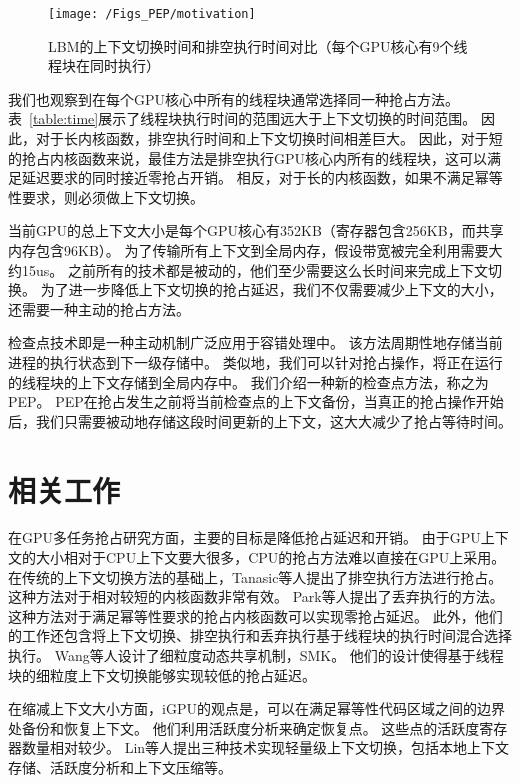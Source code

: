 \begin{figure}[htbp] %
  \centering
  \texttt{[image: /Figs\_PEP/motivation]}
  \caption{LBM的上下文切换时间和排空执行时间对比（每个GPU核心有9个线程块在同时执行）}
  \label{fig:motivation}
\end{figure}


我们也观察到在每个GPU核心中所有的线程块通常选择同一种抢占方法。
表~\ref{table:time}展示了线程块执行时间的范围远大于上下文切换的时间范围。
因此，对于长内核函数，排空执行时间和上下文切换时间相差巨大。
因此，对于短的抢占内核函数来说，最佳方法是排空执行GPU核心内所有的线程块，这可以满足延迟要求的同时接近零抢占开销。
相反，对于长的内核函数，如果不满足幂等性要求，则必须做上下文切换。

当前GPU的总上下文大小是每个GPU核心有352KB（寄存器包含256KB，而共享内存包含96KB）。
为了传输所有上下文到全局内存，假设带宽被完全利用需要大约15us。
之前所有的技术都是被动的，他们至少需要这么长时间来完成上下文切换。
为了进一步降低上下文切换的抢占延迟，我们不仅需要减少上下文的大小，还需要一种主动的抢占方法。

检查点技术即是一种主动机制广泛应用于容错处理中。
该方法周期性地存储当前进程的执行状态到下一级存储中。
类似地，我们可以针对抢占操作，将正在运行的线程块的上下文存储到全局内存中。
我们介绍一种新的检查点方法，称之为PEP。
PEP在抢占发生之前将当前检查点的上下文备份，当真正的抢占操作开始后，我们只需要被动地存储这段时间更新的上下文，这大大减少了抢占等待时间。

\section{相关工作}

在GPU多任务抢占研究方面，主要的目标是降低抢占延迟和开销。
由于GPU上下文的大小相对于CPU上下文要大很多，CPU的抢占方法难以直接在GPU上采用。
在传统的上下文切换方法的基础上，Tanasic等人提出了排空执行方法进行抢占。
这种方法对于相对较短的内核函数非常有效。
Park等人提出了丢弃执行的方法。
这种方法对于满足幂等性要求的抢占内核函数可以实现零抢占延迟。
此外，他们的工作还包含将上下文切换、排空执行和丢弃执行基于线程块的执行时间混合选择执行。
Wang等人设计了细粒度动态共享机制，SMK。
他们的设计使得基于线程块的细粒度上下文切换能够实现较低的抢占延迟。

在缩减上下文大小方面，iGPU的观点是，可以在满足幂等性代码区域之间的边界处备份和恢复上下文。 
他们利用活跃度分析来确定恢复点。
这些点的活跃度寄存器数量相对较少。
Lin等人提出三种技术实现轻量级上下文切换，包括本地上下文存储、活跃度分析和上下文压缩等。

